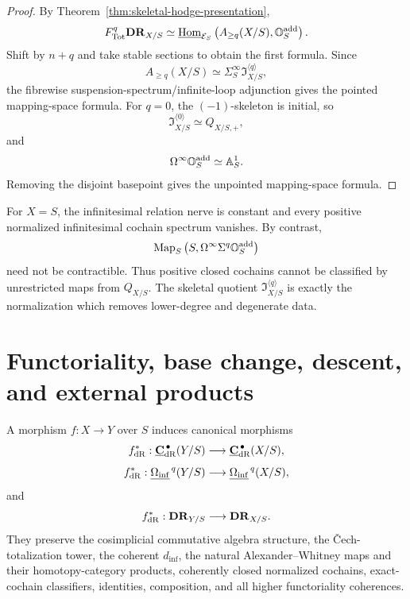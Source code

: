 \begin{proof}
By Theorem~\ref{thm:skeletal-hodge-presentation},
\[
    F_{\mathrm{Tot}}^q\mathbf{DR}_{X/S}
    \simeq
    \underline{\operatorname{Hom}}_{\mathcal E_S}
    \left(
        A_{\geq q}(X/S),\mathbb O_S^{\mathrm{add}}
    \right).
\]
Shift by \(n+q\) and take stable sections to obtain the first formula.  Since
\[
    A_{\geq q}(X/S)
    \simeq
    \Sigma^\infty_S\mathfrak I^{\langle q\rangle}_{X/S},
\]
the fibrewise suspension-spectrum/infinite-loop adjunction gives the pointed mapping-space formula.
For \(q=0\), the \((-1)\)-skeleton is initial, so
\[
    \mathfrak I^{\langle0\rangle}_{X/S}\simeq Q_{X/S,+},
\]
and
\[
    \Omega^\infty\mathbb O_S^{\mathrm{add}}\simeq\mathbb A^1_S.
\]
Removing the disjoint basepoint gives the unpointed mapping-space formula.
\end{proof}

\begin{remark}
For \(X=S\), the infinitesimal relation nerve is constant and every positive normalized infinitesimal cochain
spectrum vanishes.  By contrast,
\[
    \operatorname{Map}_S
    \left(
        S,\Omega^\infty\Sigma^q\mathbb O_S^{\mathrm{add}}
    \right)
\]
need not be contractible.  Thus positive closed cochains cannot be classified by unrestricted maps from
\(Q_{X/S}\).  The skeletal quotient
\(\mathfrak I^{\langle q\rangle}_{X/S}\) is exactly the normalization which removes lower-degree and
degenerate data.
\end{remark}


\section{Functoriality, base change, descent, and external products}
\label{sec:modal-de-rham-functoriality}

\begin{theorem}
\label{thm:modal-de-rham-contravariant-functoriality}
A morphism \(f:X\to Y\) over \(S\) induces canonical morphisms
\[
    f_{\mathrm{dR}}^*:
    \underline{\mathbf C}_{\mathrm{dR}}^{\,\bullet}(Y/S)
    \longrightarrow
    \underline{\mathbf C}_{\mathrm{dR}}^{\,\bullet}(X/S),
\]
\[
    f_{\mathrm{dR}}^*:
    \underline{\Omega_{\mathrm{inf}}}^{\,q}(Y/S)
    \longrightarrow
    \underline{\Omega_{\mathrm{inf}}}^{\,q}(X/S),
\]
and
\[
    f_{\mathrm{dR}}^*:
    \mathbf{DR}_{Y/S}
    \longrightarrow
    \mathbf{DR}_{X/S}.
\]
They preserve the cosimplicial commutative algebra structure, the \v{C}ech-totalization tower, the coherent
\(d_{\inf}\), the natural Alexander--Whitney maps and their homotopy-category products, coherently
closed normalized cochains, exact-cochain classifiers, identities, composition, and all higher functoriality
coherences.
\end{theorem}

